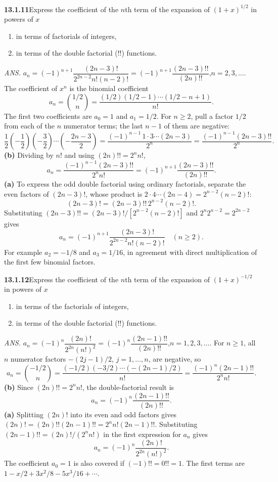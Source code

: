 \par\bigskip
\noindent\textbf{13.1.11}\quad Express the coefficient of the $n$th term of
the expansion of $(1+x)^{1/2}$ in powers of $x$
\begin{enumerate}
\item[(a)] in terms of factorials of integers,
\item[(b)] in terms of the double factorial ($!!$) functions.
\end{enumerate}
\par\nobreak\hfill\emph{ANS.}\enspace
$a_{n}=(-1)^{n+1}\dfrac{(2n-3)!}{2^{2n-2}n!(n-2)!}
=(-1)^{n+1}\dfrac{(2n-3)!!}{(2n)!!}$,\quad$n=2,3,\ldots$.
\solution
The coefficient of $x^n$ is the binomial coefficient
\[
a_n=\binom{1/2}{n}
=\frac{(1/2)(1/2-1)\cdots(1/2-n+1)}{n!}.
\]
The first two coefficients are $a_0=1$ and $a_1=1/2$.
For $n\ge2$, pull a factor $1/2$ from each of the $n$ numerator
terms; the last $n-1$ of them are negative:
\[
\frac12\left(-\frac12\right)\left(-\frac32\right)\cdots
\left(-\frac{2n-3}2\right)
=\frac{(-1)^{n-1}\,1\cdot3\cdots(2n-3)}{2^n}
=\frac{(-1)^{n-1}(2n-3)!!}{2^n}.
\]
\textbf{(b)} Dividing by $n!$ and using $(2n)!!=2^n n!$,
\[
a_n=\frac{(-1)^{n-1}(2n-3)!!}{2^n n!}
=\boxed{(-1)^{n+1}\frac{(2n-3)!!}{(2n)!!}}.
\]
\textbf{(a)} To express the odd double factorial using ordinary
factorials, separate the even factors of $(2n-3)!$, whose product is
$2\cdot4\cdots(2n-4)=2^{n-2}(n-2)!$:
\[
(2n-3)!=(2n-3)!!\,2^{n-2}(n-2)!.
\]
Substituting $(2n-3)!!=(2n-3)!/[2^{n-2}(n-2)!]$ and
$2^n2^{n-2}=2^{2n-2}$ gives
\[
\boxed{a_n=(-1)^{n+1}\frac{(2n-3)!}{2^{2n-2}n!(n-2)!}
\quad(n\ge2)}.
\]
For example $a_2=-1/8$ and $a_3=1/16$, in agreement with direct
multiplication of the first few binomial factors.


\par\bigskip
\noindent\textbf{13.1.12}\quad Express the coefficient of the $n$th term of
the expansion of $(1+x)^{-1/2}$ in powers of $x$
\begin{enumerate}
\item[(a)] in terms of the factorials of integers,
\item[(b)] in terms of the double factorial ($!!$) functions.
\end{enumerate}
\par\nobreak\hfill\emph{ANS.}\enspace
$a_{n}=(-1)^{n}\dfrac{(2n)!}{2^{2n}(n!)^{2}}
=(-1)^{n}\dfrac{(2n-1)!!}{(2n)!!}$,\quad$n=1,2,3,\ldots$.
\solution
For $n\ge1$, all $n$ numerator factors $-(2j-1)/2$,
$j=1,\ldots,n$, are negative, so
\[
a_n=\binom{-1/2}{n}
=\frac{(-1/2)(-3/2)\cdots(-(2n-1)/2)}{n!}
=\frac{(-1)^n(2n-1)!!}{2^n n!}.
\]
\textbf{(b)} Since $(2n)!!=2^n n!$, the double-factorial result is
\[
\boxed{a_n=(-1)^n\frac{(2n-1)!!}{(2n)!!}}.
\]
\textbf{(a)} Splitting $(2n)!$ into its even and odd factors gives
$(2n)!=(2n)!!(2n-1)!!=2^n n!(2n-1)!!$.  Substituting
$(2n-1)!!=(2n)!/(2^nn!)$ in the first expression for $a_n$ gives
\[
\boxed{a_n=(-1)^n\frac{(2n)!}{2^{2n}(n!)^2}}.
\]
The coefficient $a_0=1$ is also covered if $(-1)!!=0!!=1$.
The first terms are $1-x/2+3x^2/8-5x^3/16+\cdots$.



